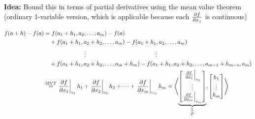\begin{myproof}
	\textbf{Idea:} Bound this in terms of partial derivatives using the mean value theorem (ordinary 1-variable version, which is applicable because each $\del{f}{x_j}$ is continuous)

	\begin{align*}
		f(a+h)-f(a) & = f(a_1+h_1,a_2,\dots, a_m) - f(a)                                                                                                                                                                                       \\
		            & \quad + f(a_1+h_1,a_2+h_2,\dots, a_m) - f(a_1+h_1,a_2,\dots, a_m)                                                                                                                                                        \\
		            & \quad \qquad\qquad\qquad \vdots\qquad\qquad\qquad\qquad\qquad\qquad \vdots                                                                                                                                               \\
		            & \quad + f(a_1+h_1,a_2+h_2,\dots, a_m+h_m) - f(a_1+h_1,a_2+h_2,\dots,a_{m-1}+h_{m-1}, a_m)                                                                                                                                \\
		            & \overset{\text{MVT}}{=} \lt.\del{f}{x_1}\rt|_{v_1}h_1+\lt.\del{f}{x_2}\rt|_{v_2}h_2+\cdots + \lt.\del{f}{x_m}\rt|_{v_m}h_m =\lt\langle \underbrace{\lt[\begin{matrix}
					                                                                                                                                                                     \lt.\del{f}{x_1}\rt|_{v_1} \\ \vdots \\ \lt.\del{f}{x_m}\rt|_{v_m}
				                                                                                                                                                                     \end{matrix} \rt]}_{\substack{\parallel \\ p}}, \lt[ \begin{matrix}
				h_1 \\ \vdots \\ h_m
			\end{matrix} \rt] \rt\rangle
	\end{align*}
	\begin{center}
		\begin{tikzpicture}

\end{tikzpicture}
\end{center}
\end{myproof}
